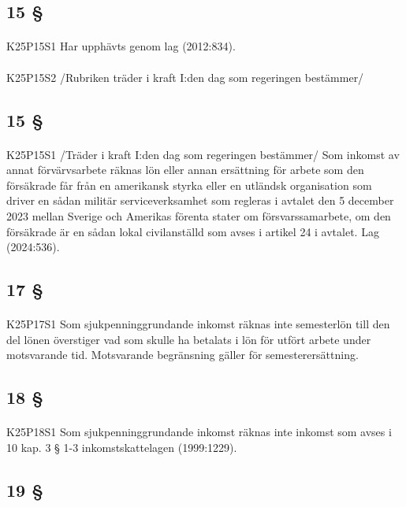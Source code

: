 \documentclass[a4paper,notitlepage,openany,10pt]{book}
\begin{document}
\subsection*{15 §}
\paragraph*{}
{\tiny K25P15S1}
Har upphävts genom
lag (2012:834).
\paragraph*{}
{\tiny K25P15S2}
/Rubriken träder i kraft I:den dag som regeringen bestämmer/
\subsection*{15 §}
\paragraph*{}
{\tiny K25P15S1}
/Träder i kraft I:den dag som regeringen bestämmer/
Som inkomst av annat förvärvsarbete räknas lön eller annan ersättning för arbete som den försäkrade får från en amerikansk styrka eller en utländsk organisation som driver en sådan militär serviceverksamhet som regleras i avtalet den 5 december 2023 mellan Sverige och Amerikas förenta stater om försvarssamarbete, om den försäkrade är en sådan lokal civilanställd som avses i artikel 24 i avtalet.
Lag (2024:536).
\subsection*{17 §}
\paragraph*{}
{\tiny K25P17S1}
Som sjukpenninggrundande inkomst räknas inte semesterlön till den del lönen överstiger vad som skulle ha betalats i lön för utfört arbete under motsvarande tid. Motsvarande begränsning gäller för semesterersättning.
\subsection*{18 §}
\paragraph*{}
{\tiny K25P18S1}
Som sjukpenninggrundande inkomst räknas inte inkomst som avses i 10 kap. 3 § 1-3 inkomstskattelagen (1999:1229).
\subsection*{19 §}
\end{document}
